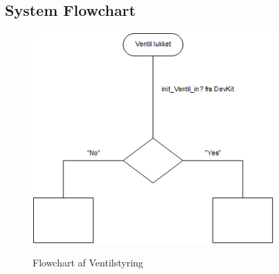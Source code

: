 \subsection{System Flowchart}

\begin{figure}[H]
	\centering
	\includegraphics[width=0.82\textwidth]{Systemarkitektur/Ventiler/Ventilstyring_Flowchart.png}
	\label{fig:Ventilstyring FC}
	\caption{Flowchart af Ventilstyring}
\end{figure}